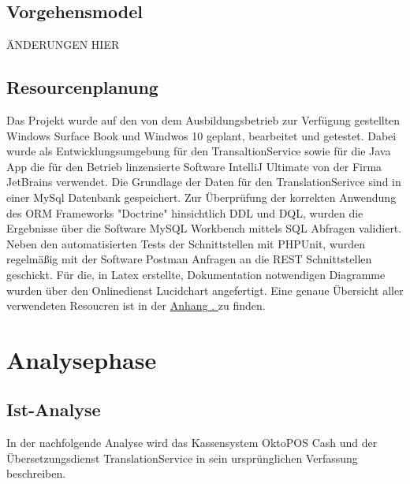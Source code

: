 \documentclass[10pt, oneside]{article}
\newcommand{\attsecref}[1]{\hyperref[{#1}]{Anhang \thesubsection. \nameref*{#1}}}
\begin{document}
  \subsection{Vorgehensmodel}%
    ÄNDERUNGEN HIER
  \subsection{Resourcenplanung}%
    Das Projekt wurde auf den von dem Ausbildungsbetrieb zur Verfügung gestellten Windows Surface Book und Windwos 10 geplant, bearbeitet und getestet. 
    Dabei wurde als Entwicklungsumgebung für den TransaltionService sowie für die Java App die für den Betrieb linzensierte 
    Software IntelliJ Ultimate von der Firma JetBrains verwendet. 
    Die Grundlage der Daten für den TranslationSerivce sind in einer MySql Datenbank gespeichert. 
    Zur Überprüfung der korrekten Anwendung des ORM Frameworks "Doctrine" hinsichtlich DDL und DQL, 
    wurden die Ergebnisse über die Software MySQL Workbench mittels SQL Abfragen validiert. 
    Neben den automatisierten Tests der Schnittstellen mit PHPUnit, 
    wurden regelmäßig mit der Software Postman Anfragen an die REST Schnittstellen geschickt.
    Für die, in Latex erstellte, Dokumentation notwendigen Diagramme wurden über den Onlinedienst Lucidchart angefertigt.
    Eine genaue Übersicht aller verwendeten Resoucren ist in der \attsecref{sec:resources} zu finden.
  \section{Analysephase}
  \subsection{Ist-Analyse}\label{sec:analyse:current}%
    In der nachfolgende Analyse wird das Kassensystem OktoPOS Cash und der Übersetzungsdienst TranslationService in sein ursprünglichen Verfassung beschreiben.
\end{document}
